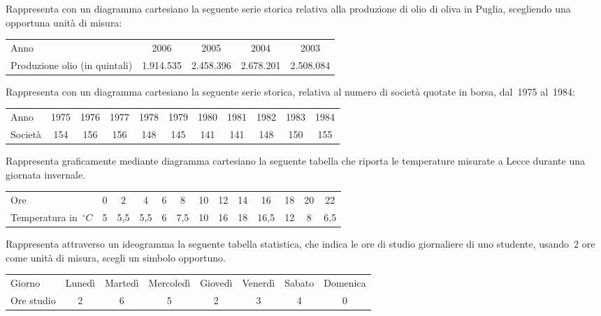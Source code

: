 \begin{esercizio}
\label{ese:A.10}
Rappresenta con un diagramma cartesiano la seguente serie storica relativa 
alla produzione di olio di oliva in Puglia,
scegliendo una opportuna unità di misura:
\begin{center}
 \begin{tabularx}{.9\textwidth}{Xcccc}
\toprule
Anno & 2006 & 2005 & 2004 & 2003\\
Produzione olio (in quintali)& 1.914.535 & 2.458.396 & 2.678.201 & 
2.508.084\\
\bottomrule
\end{tabularx}
\end{center}
\end{esercizio}

\begin{esercizio}
\label{ese:A.11}
Rappresenta con un diagramma cartesiano la seguente serie storica, relativa 
al numero di società quotate in borsa, dal~1975 al~1984:
\begin{center}
 \begin{tabular}{lcccccccccc}
\toprule
Anno & 1975 & 1976 & 1977 & 1978 & 1979 & 1980 & 1981 & 1982 & 1983 & 1984 
\\
Società & 154 & 156 & 156 & 148 & 145 & 141 & 141 & 148 & 150 & 155 \\
\bottomrule
\end{tabular}
\end{center}
\end{esercizio}

\begin{esercizio}
\label{ese:A.12}
Rappresenta graficamente mediante diagramma cartesiano la seguente tabella 
che riporta le temperature misurate a Lecce durante una giornata invernale.
\begin{center}
\begin{tabularx}{.9\textwidth}{X*{12}{c}}
\toprule
Ore & 0 & 2 & 4 & 6 & 8  & 10 & 12 & 14 & 16 & 18 & 20 & 22\\
Temperatura in~\(\unit{^\circ C}\) & 5 & 5,5  & 5,5 & 6 & 7,5 & 10 & 16 & 18 
& 16,5 & 12 & 8 & 6,5\\
\bottomrule
\end{tabularx}
\end{center}
\end{esercizio}

\begin{esercizio}
\label{ese:A.13}
Rappresenta attraverso un ideogramma la seguente tabella statistica, che 
indica le ore di studio giornaliere di uno studente,
usando~2 ore come unità di misura, scegli un simbolo opportuno.
\begin{center}
\begin{tabular}{l*{7}{c}}
\toprule
Giorno & Lunedì & Martedì & Mercoledì & Giovedì & Venerdì & Sabato & 
Domenica \\
Ore studio & 2 & 6 & 5 & 2 & 3 & 4 & 0 \\
\bottomrule
\end{tabular}
\end{center}
\end{esercizio}


